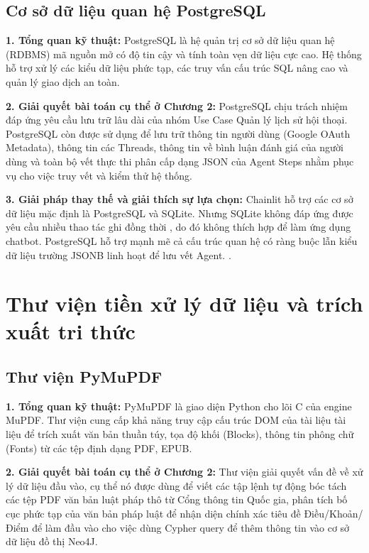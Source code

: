 \documentclass[../DoAn.tex]{subfiles}
\begin{document}
\subsection{Cơ sở dữ liệu quan hệ PostgreSQL}
\label{subsection:3.2.2}

\textbf{1. Tổng quan kỹ thuật:}
PostgreSQL là hệ quản trị cơ sở dữ liệu quan hệ (RDBMS) mã nguồn mở có độ tin cậy và tính toàn vẹn dữ liệu cực cao. Hệ thống hỗ trợ xử lý các kiểu dữ liệu phức tạp, các truy vấn cấu trúc SQL nâng cao và quản lý giao dịch an toàn.

\textbf{2. Giải quyết bài toán cụ thể ở Chương 2:}
PostgreSQL chịu trách nhiệm đáp ứng yêu cầu lưu trữ lâu dài của nhóm Use Case Quản lý lịch sử hội thoại. PostgreSQL còn được sử dụng để lưu trữ thông tin người dùng (Google OAuth Metadata), thông tin các Threads, thông tin về bình luận đánh giá của người dùng và toàn bộ vết thực thi phân cấp dạng JSON của Agent Steps nhằm phục vụ cho việc truy vết và kiểm thử hệ thống.

\textbf{3. Giải pháp thay thế và giải thích sự lựa chọn:}
Chainlit hỗ trợ các cơ sở dữ liệu mặc định là PostgreSQL và SQLite. Nhưng SQLite không đáp ứng được yêu cầu nhiều thao tác ghi đồng thời \cite{SQLiteDoc}, do đó không thích hợp để làm ứng dụng chatbot. PostgreSQL hỗ trợ mạnh mẽ cả cấu trúc quan hệ có ràng buộc lẫn kiểu dữ liệu trường JSONB linh hoạt để lưu vết Agent. \cite{ChainlitDoc}.

\section{Thư viện tiền xử lý dữ liệu và trích xuất tri thức}
\label{section:3.3}

\subsection{Thư viện PyMuPDF}
\label{subsection:3.3.1}

\textbf{1. Tổng quan kỹ thuật:}
PyMuPDF là giao diện Python cho lõi C của engine MuPDF. Thư viện cung cấp khả năng truy cập cấu trúc DOM của tài liệu tài liệu để trích xuất văn bản thuần túy, tọa độ khối (Blocks), thông tin phông chữ (Fonts) từ các tệp định dạng PDF, EPUB.

\textbf{2. Giải quyết bài toán cụ thể ở Chương 2:}
Thư viện giải quyết vấn đề về xử lý dữ liệu đầu vào, cụ thể nó được dùng để viết các tập lệnh tự động bóc tách các tệp PDF văn bản luật pháp thô từ Cổng thông tin Quốc gia, phân tích bố cục phức tạp của văn bản pháp luật để nhận diện chính xác tiêu đề Điều/Khoản/Điểm để làm đầu vào cho việc dùng Cypher query để thêm thông tin vào cơ sở dữ liệu đồ thị Neo4J.
\end{document}
